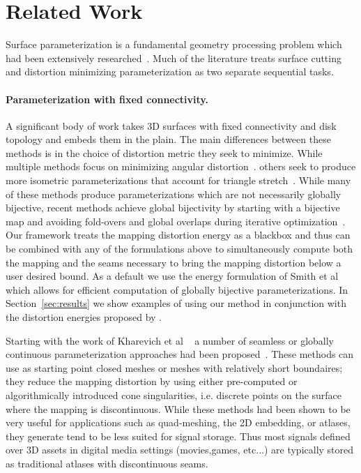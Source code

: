 
\section{Related Work}
Surface parameterization is a fundamental geometry processing problem which had been extensively researched~\cite{Sheffer07_ParameterizationSurvey,Hormann2008}.
Much of the literature treats  surface cutting and distortion minimizing parameterization as two separate sequential tasks. 

\paragraph{Parameterization with fixed connectivity.}
A significant body of work takes 3D surfaces with fixed connectivity and disk topology and embeds them in the plain.  The main differences between these methods is in the choice of distortion metric they seek to minimize.  While multiple methods focus on minimizing angular distortion~\cite{Floater2003,Sheffer2005ABFPP,Levy2002,Aigerman2015,Sawhney:2017}. 
others seek to produce more isometric parameterizations that account for triangle stretch~\cite{Sander2001Texture,Hormann2000MIPS,Rabinovich2017,Zhu2017BCQN,Shtengel:GOvCM:2017,claici2017isometry}. While many of these methods produce parameterizations which are not necessarily globally bijective, recent methods achieve global bijectivity by starting with a bijective map and avoiding fold-overs and global overlaps during iterative optimization~\cite{Smith2015Bijective,Jiang2017Simplicial}.
Our framework treats the mapping distortion energy as a blackbox and thus can be combined with any of the formulations above to simultaneously compute both the mapping and the seams necessary to bring the mapping distortion below a user desired bound. As a default we use the energy formulation of Smith et al~ which allows for efficient computation of globally bijective parameterizations.  
In Section~\ref{sec:results} we show examples of using our method in conjunction with the distortion energies proposed by .
%
 

Starting with the work of Kharevich et al ~\cite{Kharevich} a number of seamless or globally continuous parameterization approaches had been proposed~\cite{pgp,others}. These methods can use as starting point closed meshes or meshes with relatively short boundaires; they reduce the mapping distortion by using either pre-computed or algorithmically introduced cone singularities, i.e. discrete points on the surface where the mapping is discontinuous. While these methods had been shown to be very useful for applications such as quad-meshing, the 2D embedding, or atlases, they generate tend to be less suited for signal storage. Thus most signals defined over 3D assets in digital media settings (movies,games, etc...) are typically stored as traditional atlases with discontinuous seams.  


